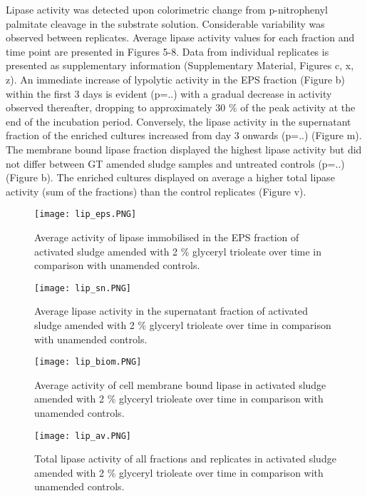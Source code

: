 \documentclass[11pt]{article}
\begin{document}
Lipase activity was detected upon colorimetric change from p-nitrophenyl palmitate cleavage in the substrate solution. 
Considerable variability was observed between replicates. Average lipase activity values for each fraction and time point are presented in Figures 5-8. Data from individual replicates is presented as supplementary information (Supplementary Material,  Figures c, x, z).
An immediate increase of lypolytic activity in the EPS fraction (Figure b) within the first 3 days is evident (p=..) with a gradual decrease in activity observed thereafter, dropping to approximately 30 \% of the peak activity at  the end of the incubation period. 
Conversely, the lipase activity in the supernatant fraction of the enriched cultures increased from day 3 onwards (p=..) (Figure m). The membrane bound lipase fraction displayed the highest lipase activity but did not differ between GT amended sludge samples and untreated controls (p=..) (Figure b). The enriched cultures displayed on average a higher total lipase activity (sum of the fractions) than the control replicates (Figure v).
                                                                                                                                                                                                                                         
\begin{figure}
\texttt{[image: lip\_eps.PNG]}
\caption{Average activity of lipase immobilised in the EPS fraction of activated sludge amended with 2 \% glyceryl trioleate over time in comparison with unamended controls.}
\end{figure}

\begin{figure}
\texttt{[image: lip\_sn.PNG]}
\caption{Average lipase activity in the supernatant fraction of activated sludge amended with 2 \% glyceryl trioleate over time in comparison with unamended controls.}
\end{figure}

\begin{figure}
\texttt{[image: lip\_biom.PNG]}
\caption{Average activity of cell membrane bound lipase in activated sludge amended with 2 \% glyceryl trioleate over time in comparison with unamended controls.}
\end{figure}


\begin{figure}
\texttt{[image: lip\_av.PNG]}
\caption{Total lipase activity of all fractions and replicates in activated sludge amended with 2 \% glyceryl trioleate over time in comparison with unamended controls.}
\end{figure}
\FloatBarrier
\end{document}
